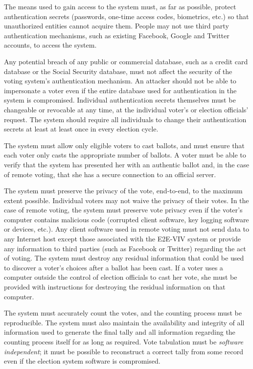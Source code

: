 The means used to gain access to the system must, as far as possible,
protect authentication secrets (passwords, one-time access codes,
biometrics, etc.) so that unauthorized entities cannot acquire
them. People may not use third party authentication mechanisms, such
as existing Facebook, Google and Twitter accounts, to access the
system. 

Any potential breach of any public or commercial database, such as a
credit card database or the Social Security database, must not affect
the security of the voting system's authentication mechanism. An
attacker should not be able to impersonate a voter even if the entire
database used for authentication in the system is
compromised. Individual authentication secrets themselves must be
changeable or revocable at any time, at the individual voter's or
election officials' request. The system should require all individuals
to change their authentication secrets at least at least once in every
election cycle.

The system must allow only eligible voters to cast ballots, and must
ensure that each voter only casts the appropriate number of ballots. A
voter must be able to verify that the system has presented her with an
authentic ballot and, in the case of remote voting, that she has a
secure connection to an official server.

The system must preserve the privacy of the vote, end-to-end, to the
maximum extent possible. Individual voters may not waive the privacy
of their votes. In the case of remote voting, the system must preserve
vote privacy even if the voter's computer contains malicious code
(corrupted client software, key logging software or devices,
etc.). Any client software used in remote voting must not send data to
any Internet host except those associated with the E2E-VIV system or
provide any information to third parties (such as Facebook or Twitter)
regarding the act of voting. The system must destroy any residual
information that could be used to discover a voter's choices after a
ballot has been cast. If a voter uses a computer outside the control
of election officials to cast her vote, she must be provided with
instructions for destroying the residual information on that computer.

The system must accurately count the votes, and the counting process
must be reproducible. The system must also maintain the availability
and integrity of all information used to generate the final tally and
all information regarding the counting process itself for as long as
required. Vote tabulation must be \emph{software independent}; it must
be possible to reconstruct a correct tally from some record even if
the election system software is compromised.


